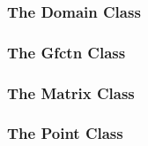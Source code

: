\documentclass[a4paper,10pt]{article}
\begin{document}
\subsubsection*{The Domain Class}



\subsubsection*{The Gfctn Class}



\subsubsection*{The Matrix Class}



\subsubsection*{The Point Class}


\end{document}

